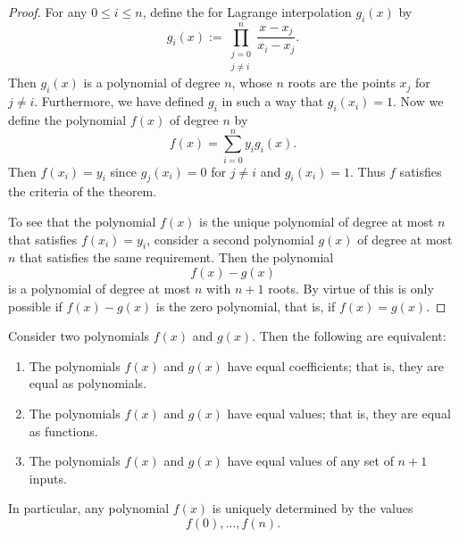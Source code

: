 \begin{proof}
  For any $0\leq i\leq n$, define the  for Lagrange interpolation $g_i(x)$ by
  \begin{equation*}
    g_i(x) := \prod_{\substack{j=0\\j\neq i}}^n \frac{x-x_j}{x_i-x_j}.
  \end{equation*}
  Then $g_i(x)$ is a polynomial of degree $n$, whose $n$ roots are the points $x_j$ for $j\neq i$. Furthermore, we have defined $g_i$ in such a way that $g_i(x_i)=1$. Now we define the polynomial $f(x)$ of degree $n$ by
  \begin{equation*}
    f(x)=\sum_{i=0}^n y_ig_i(x).
  \end{equation*}
  Then $f(x_i)=y_i$ since $g_j(x_i)=0$ for $j\neq i$ and $g_i(x_i)=1$. Thus $f$ satisfies the criteria of the theorem.

  To see that the polynomial $f(x)$ is the unique polynomial of degree at most $n$ that satisfies $f(x_i)=y_i$, consider a second polynomial $g(x)$ of degree at most $n$ that satisfies the same requirement. Then the polynomial
  \begin{equation*}
    f(x)-g(x)
  \end{equation*}
  is a polynomial of degree at most $n$ with $n+1$ roots. By virtue of  this is only possible if $f(x)-g(x)$ is the zero polynomial, that is, if $f(x)=g(x)$.
\end{proof}

\begin{corollary}\label{corollary:extensionality-integer-polynomials}
  Consider two polynomials $f(x)$ and $g(x)$. Then the following are equivalent:
  \begin{enumerate}
  \item The polynomials $f(x)$ and $g(x)$ have equal coefficients; that is, they are equal as polynomials.
  \item The polynomials $f(x)$ and $g(x)$ have equal values; that is, they are equal as functions.
  \item The polynomials $f(x)$ and $g(x)$ have equal values of any set of $n+1$ inputs.
  \end{enumerate}
  In particular, any polynomial $f(x)$ is uniquely determined by the values
  \begin{equation*}
    f(0),\ldots,f(n).
  \end{equation*}
\end{corollary}

